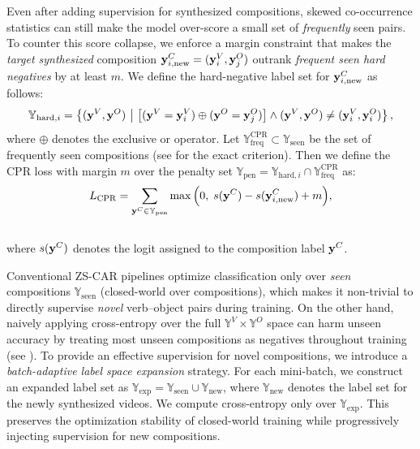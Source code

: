 Even after adding supervision for synthesized compositions, skewed co-occurrence statistics can still make the model over-score a small set of \emph{frequently} seen pairs.
To counter this score collapse, we enforce a margin constraint that makes the \emph{target synthesized} composition
$\mathbf{y}^C_{i,\text{new}}=(\mathbf{y}_i^V,\mathbf{y}_j^O)$
outrank \emph{frequent seen hard negatives} by at least $m$.
We define the hard-negative label set for $\mathbf{y}^C_{i,\text{new}}$ as follows:
\begin{align}
\mathbb{Y}_{\text{hard},i}
=
\left\{
(\mathbf{y}^V,\mathbf{y}^O)~\middle|~\big[(\mathbf{y}^V=\mathbf{y}_i^V)\oplus(\mathbf{y}^O=\mathbf{y}_j^O)\big] \land (\mathbf{y}^V,\mathbf{y}^O)\neq(\mathbf{y}_i^V,\mathbf{y}_i^O)
\right\},
\label{eq:hard}
\end{align}
where $\oplus$ denotes the exclusive or operator.
Let $\mathbb{Y}_{\text{freq}}^\text{CPR} \subset \mathbb{Y}_{\text{seen}}$ be the set of frequently seen compositions 
(see  for the exact criterion).
Then we define the CPR loss with margin $m$ over the penalty set $\mathbb{Y}_{\text{pen}}=\mathbb{Y}_{\text{hard},i} \cap \mathbb{Y}_{\text{freq}}^\text{CPR}$ as:\\
\begin{align}
L_{\text{CPR}}
= \sum_{\mathbf{y}^C \in \mathbb{Y}_{\text{pen}}}
\max\Big(0,\; s(\mathbf{y}^C) - s(\mathbf{y}^C_{i,\text{new}}) + m\Big),
\label{eq:cpr_margin}
\end{align}
\\
where $s(\mathbf{y}^C)$ denotes the logit assigned to the composition label $\mathbf{y}^C$.




Conventional ZS-CAR pipelines optimize classification only over \emph{seen} compositions $\mathbb{Y}_{\text{seen}}$ (closed-world over compositions), which makes it non-trivial to directly supervise \emph{novel} verb--object pairs during training.
On the other hand, naively applying cross-entropy over the full $\mathbb{Y}^V \times \mathbb{Y}^O$ space can harm unseen accuracy by treating most unseen compositions as negatives throughout training (see ).
To provide an effective supervision for novel compositions, we introduce a \emph{batch-adaptive label space expansion} strategy.
For each mini-batch, we construct an expanded label set as $\mathbb{Y}_{\text{exp}} = \mathbb{Y}_{\text{seen}} \cup \mathbb{Y}_{\text{new}}$, where $\mathbb{Y}_{\text{new}}$ denotes the label set for the newly synthesized videos.
We compute cross-entropy only over $\mathbb{Y}_{\text{exp}}$.
This preserves the optimization stability of closed-world training while progressively injecting supervision for new compositions.







